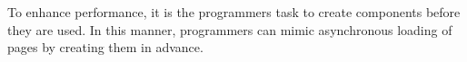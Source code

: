 \documentclass[a4paper]{artikel3}
\newcommand{\term}[1]{\emph{#1}}
\newcommand{\code}[1]{\texttt{#1}}
\renewcommand{\paragraph}[1]{{\bf #1} }
\begin{document}
To enhance performance,  it is the programmers task to create components before they are used.  In this manner,  programmers can mimic asynchronous loading of pages by creating them in advance.

% 
% 

% 
% 
\end{document}
